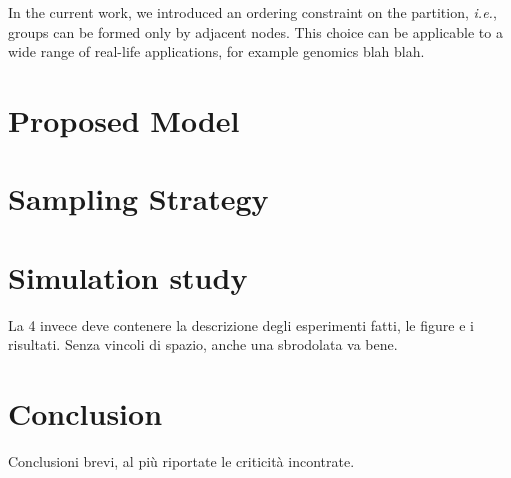 In the current work, we introduced an ordering constraint on the partition, \emph{i.e.}, groups can be formed only by adjacent nodes. This choice can be applicable to a wide range of real-life applications, for example genomics blah blah. 




\section{Proposed Model}


\section{Sampling Strategy}


\section{Simulation study}

La 4 invece deve contenere la descrizione degli esperimenti fatti, le figure e i risultati. Senza vincoli di spazio, anche una sbrodolata va bene.


\section{Conclusion}

Conclusioni brevi, al più riportate le criticità incontrate.